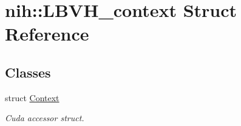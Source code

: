 \hypertarget{structnih_1_1_l_b_v_h__context}{
\section{nih\-:\-:\-L\-B\-V\-H\-\_\-context \-Struct \-Reference}
\label{structnih_1_1_l_b_v_h__context}
}
\subsection*{\-Classes}
\begin{DoxyCompactItemize}
\item 
struct \hyperlink{structnih_1_1_l_b_v_h__context_1_1_context}{\-Context}
\begin{DoxyCompactList}\small\item\em \-Cuda accessor struct. \end{DoxyCompactList}\end{DoxyCompactItemize}
